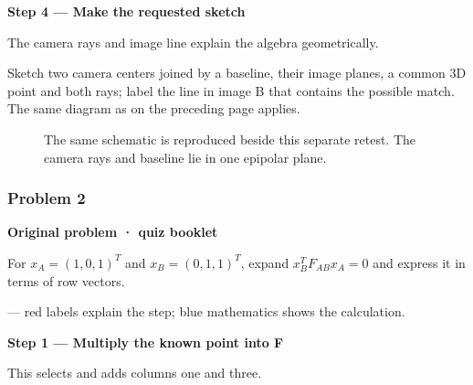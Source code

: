\documentclass[letterpaper,11pt,english,openany,oneside]{jupyterBook}
\begin{document}
\par

\par\medskip{}
{\color{QuizStepRed}\bfseries Step 4 — Make the requested sketch}\par\smallskip

\sphinxAtStartPar
{} The camera rays and image line explain the algebra geometrically.

\sphinxAtStartPar
Sketch two camera centers joined by a baseline, their image planes, a common 3D point and both rays; label the line in image B that contains the possible match. The same diagram as on the preceding page applies.

\par

\begin{figure}[H]
\centering
\capstart

\noindent{}
\caption{The same schematic is reproduced beside this separate retest. The camera rays and baseline lie in one epipolar plane.}\label{\detokenize{lectures/lecture04/quiz-workbook:id7}}\end{figure}


\subsubsection{Problem 2}
\label{\detokenize{lectures/lecture04/quiz-workbook:quiz-2-q2}}\label{\detokenize{lectures/lecture04/quiz-workbook:id2}}
\par\medskip\textbf{Original problem · quiz booklet}\par\smallskip

\sphinxAtStartPar
For \(x_A=(1,0,1)^T\) and \(x_B=(0,1,1)^T\), expand \(x_B^TF_{AB}x_A=0\) and express it in terms of row vectors.

\par\medskip

\sphinxAtStartPar
{} — red labels explain the step; blue mathematics shows the calculation.

\par\medskip{}
{\color{QuizStepRed}\bfseries Step 1 — Multiply the known point into F}\par\smallskip

\sphinxAtStartPar
{} This selects and adds columns one and three.
\end{document}
